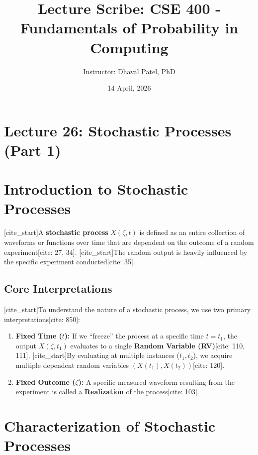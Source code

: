 \documentclass{article}
\begin{document}
\title{Lecture Scribe: CSE 400 - Fundamentals of Probability in Computing}
\author{Instructor: Dhaval Patel, PhD}
\date{14 April, 2026}

\maketitle

\section*{Lecture 26: Stochastic Processes (Part 1)}

\section{Introduction to Stochastic Processes}

[cite\_start]A \textbf{stochastic process} $X(\zeta, t)$ is defined as an entire collection of waveforms or functions over time that are dependent on the outcome of a random experiment[cite: 27, 34]. [cite\_start]The random output is heavily influenced by the specific experiment conducted[cite: 35].

\subsection{Core Interpretations}

[cite\_start]To understand the nature of a stochastic process, we use two primary interpretations[cite: 850]:

\begin{enumerate}
\item [cite\_start]\textbf{Fixed Time ($t$):} If we ``freeze'' the process at a specific time $t = t_1$, the output $X(\zeta, t_1)$ evaluates to a single \textbf{Random Variable (RV)}[cite: 110, 111]. [cite\_start]By evaluating at multiple instances ($t_1, t_2$), we acquire multiple dependent random variables $(X(t_1), X(t_2))$[cite: 120].

\item [cite\_start]\textbf{Fixed Outcome ($\zeta$):} A specific measured waveform resulting from the experiment is called a \textbf{Realization} of the process[cite: 103].
\end{enumerate}

\section{Characterization of Stochastic Processes}
\end{document}
